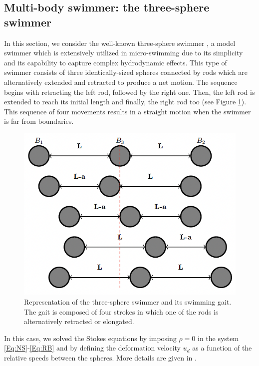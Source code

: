 \documentclass[graybox]{svmult}
\begin{document}
\subsection{Multi-body swimmer: the three-sphere swimmer}

In this section, we consider the well-known three-sphere swimmer \cite{najafi_simplest_2004}, a model swimmer which is extensively utilized in micro-swimming due to its simplicity and its capability to capture complex hydrodynamic effects.
This type of swimmer consists of three identically-sized spheres connected by rods which are alternatively extended and retracted to produce a net motion. The sequence begins with retracting the left rod, followed by the right one. Then, the left rod is extended to reach its initial length and finally, the right rod too (see Figure \ref{Fig:3ss1}). 
This sequence of four movements results in a straight motion when the swimmer is far from boundaries. 

\begin{figure}
	\centering
	\includegraphics[scale=0.55]{Figures/three-sphere/3ss.png}

	\caption{Representation of the three-sphere swimmer and its swimming gait. The gait is composed of four strokes in which one of the rods is alternatively retracted or elongated.}
	\label{Fig:3ss1}
\end{figure}

In this case, we solved the Stokes equations by imposing $\rho=0$ in the system \eqref{Eq:NS}-\eqref{Eq:RB} and by defining the deformation velocity $u_d$ as a function of the relative speeds between the spheres. More details are given in \cite{cras2021}. 
\end{document}
